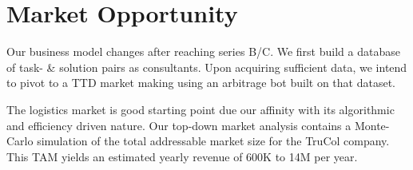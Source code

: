 \vspace{-0.16cm}
\section{Market Opportunity}
\vspace{-0.15cm}
Our business model changes after reaching series B/C. We first build a database of task- \& solution pairs as consultants. Upon acquiring sufficient data, we intend to pivot to a TTD market making using an arbitrage bot built on that dataset.

\noindent The logistics market is good starting point due our affinity with its algorithmic and efficiency driven nature. Our top-down market analysis contains a Monte-Carlo simulation of the total addressable market size for the TruCol company. This TAM yields an estimated yearly revenue of 600K to 14M per year.
